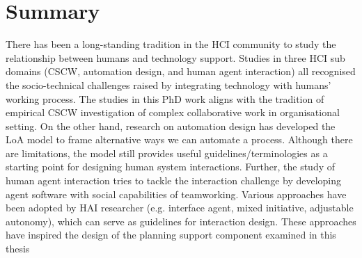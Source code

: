 

\section{Summary}


There has been a long-standing tradition in the \ac{HCI} community to study the relationship between humans and technology support. Studies in three \ac{HCI} sub domains (\ac{CSCW}, automation design, and human agent interaction) all recognised the socio-technical challenges raised by integrating technology with humans' working process. The studies in this PhD work aligns with the tradition of empirical \ac{CSCW}  investigation of complex collaborative work in organisational setting. On the other hand, research on automation design has developed the \ac{LoA} model to frame alternative ways we can automate a process. Although there are limitations, the model still provides useful guidelines/terminologies as a starting point for designing human system interactions. Further, the study of human agent interaction tries to tackle the interaction challenge by developing agent software with social capabilities of teamworking. Various approaches have been adopted by \ac{HAI} researcher (e.g. interface agent, mixed initiative, adjustable autonomy), which can serve as guidelines for interaction design. These approaches have inspired the design of the planning support component examined in this thesis\\

